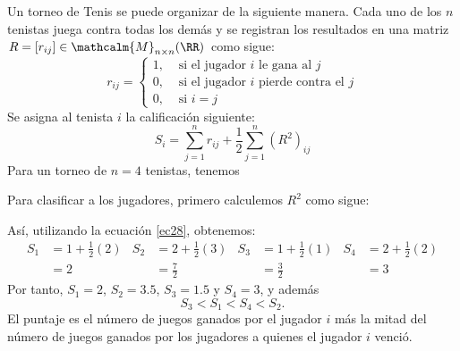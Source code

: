 \begin{examplebox}{}{}
    Un torneo de Tenis se puede organizar de la siguiente manera. Cada uno de los $n$ tenistas juega contra todas los demás y se registran los resultados en una matriz $R = [ r_{ij} ] \in \mathcalm{M}_{n \times n}(\RR)$ como sigue:
    $$r_{ij} = \begin{cases}
        1, & \text{ si el jugador $i$ le gana al $j$} \\
        0, & \text{ si el jugador $i$ pierde contra el $j$} \\
        0, & \text{ si $i = j$}
    \end{cases}$$
    Se asigna al tenista $i$ la calificación siguiente:
    \begin{equation}
        S_i = \sum_{j=1}^{n} r_{ij} + \frac{1}{2} \sum_{j=1}^{n} \left( R^{2} \right)_{ij} \label{ec28}
    \end{equation}
    Para un torneo de $n = 4$ tenistas, tenemos
    \begin{matrizn}
    \end{matrizn}
    Para clasificar a los jugadores, primero calculemos $R^{2}$ como sigue:
    \begin{matrizn}
    \end{matrizn}
    Así, utilizando la ecuación \eqref{ec28}, obtenemos:
    \begin{align*}
        S_1 & = 1 + \frac{1}{2} (2) & S_2 & = 2 + \frac{1}{2} (3) & S_3 & = 1 + \frac{1}{2} (1) & S_4 & = 2 + \frac{1}{2} (2) \\
        & = 2 & & = \frac{7}{2} & & = \frac{3}{2} & & = 3
    \end{align*}
    Por tanto, $S_1 = 2$, $S_2 = 3.5$, $S_3 = 1.5$ y $S_4 = 3$, y además
    $$S_3 < S_1 < S_4 < S_2.$$
    El puntaje es el número de juegos ganados por el jugador $i$ más la mitad del número de juegos ganados por los jugadores a quienes el jugador $i$ venció.
\end{examplebox}

